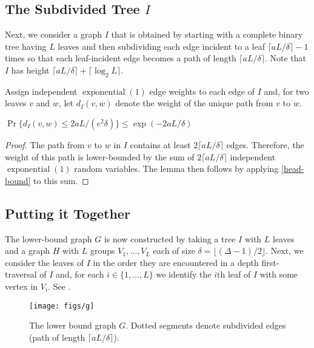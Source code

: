 \documentclass{patmorin}
\DeclareMathOperator{\exponential}{exponential}
\begin{document}
\subsection{The Subdivided Tree $I$}

Next, we consider a graph $I$ that is obtained by starting with a complete
binary tree having $L$ leaves and then subdividing each edge incident
to a leaf $\lceil aL/\delta\rceil-1$ times so that each leaf-incident
edge becomes a path of length $\lceil aL/\delta\rceil$.  Note that $I$
has height $\lceil aL/\delta\rceil+\lceil\log_2 L\rceil$.

Assign independent $\exponential(1)$ edge weights to each edge of $I$
and, for two leaves $v$ and $w$, let $d_I(v,w)$ denote the weight of
the unique path from $v$ to $w$.

\begin{lem}
   $\Pr\{d_I(v,w) \le 2aL/(e^2\delta)\} \le \exp(-2aL/\delta)$
\end{lem}

\begin{proof}
  The path from $v$ to $w$ in $I$ contains at least $2\lceil
  aL/\delta\rceil$ edges.  Therefore, the weight of this path is
  lower-bounded by the sum of $2\lceil aL/\delta\rceil$ independent
  $\exponential(1)$ random variables.  The lemma then follows by applying
  \eqref{head-bound} to this sum.
\end{proof}


\subsection{Putting it Together}

The lower-bound graph $G$ is now constructed by taking a tree $I$ with
$L$ leaves and a graph $H$ with $L$ groups $V_1,\ldots,V_L$ each of size
$\delta=\lfloor(\Delta-1)/2\rfloor$.  Next, we consider the leaves of
$I$ in the order they are encountered in a depth first-traversal of $I$
and, for each $i\in\{1,\ldots,L\}$ we identify the $i$th leaf of $I$
with some vertex in $V_i$.  See .

\begin{figure}
  \begin{center}
    \texttt{[image: figs/g]}
  \end{center}
  \caption{The lower bound graph $G$. Dotted segments denote subdivided edges (path of length $\lceil aL/\delta\rceil$).}
\end{figure}
\end{document}
